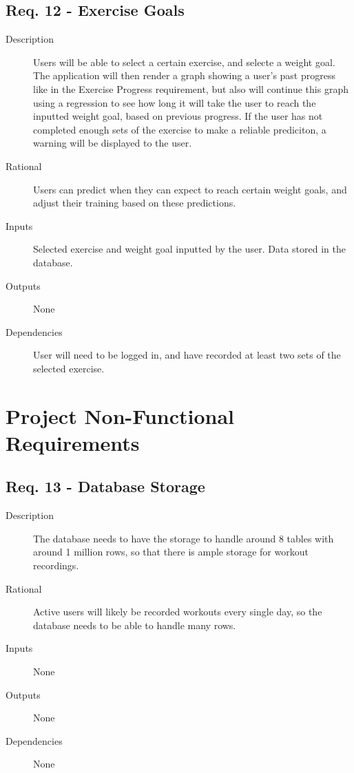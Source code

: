 \documentclass[12pt]{article}
\begin{document}
\subsection{Req. 12 - Exercise Goals}
\begin{description}
	\item[Description] Users will be able to select a certain exercise, and selecte a weight goal. The application will then render a graph showing a user's past progress like in the Exercise Progress requirement, but also will continue this graph using a regression to see how long it will take the user to reach the inputted weight goal, based on previous progress. If the user has not completed enough sets of the exercise to make a reliable prediciton, a warning will be displayed to the user.
	\item[Rational] Users can predict when they can expect to reach certain weight goals, and adjust their training based on these predictions.
	\item[Inputs] Selected exercise and weight goal inputted by the user. Data stored in the database.
	\item[Outputs] None
	\item[Dependencies] User will need to be logged in, and have recorded at least two sets of the selected exercise.
\end{description}
\section{Project Non-Functional Requirements}

\subsection{Req. 13 - Database Storage}
\begin{description}
	\item[Description] The database needs to have the storage to handle around 8 tables with around 1 million rows, so that there is ample storage for workout recordings.
	\item[Rational] Active users will likely be recorded workouts every single day, so the database needs to be able to handle many rows.
	\item[Inputs] None
	\item[Outputs] None
	\item[Dependencies] None
\end{description}
\end{document}
